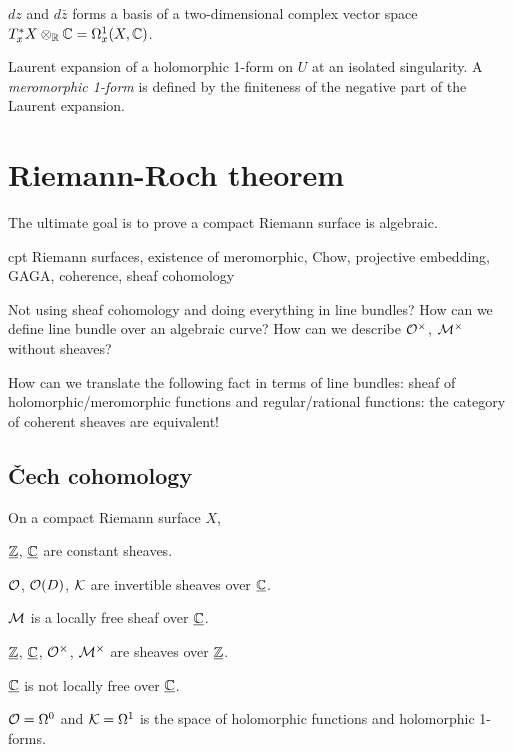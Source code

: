 \documentclass{../../large}
\begin{document}
$dz$ and $d\bar z$ forms a basis of a two-dimensional complex vector space $T_x^*X\otimes_{\mathbb{R}}\mathbb{C}=\Omega^1_x(X,\mathbb{C})$.

Laurent expansion of a holomorphic 1-form on $U$ at an isolated singularity.
A \emph{meromorphic 1-form} is defined by the finiteness of the negative part of the Laurent expansion.


\chapter{Riemann-Roch theorem}

The ultimate goal is to prove a compact Riemann surface is algebraic.

cpt Riemann surfaces, existence of meromorphic, Chow, projective embedding, GAGA, coherence, sheaf cohomology

Not using sheaf cohomology and doing everything in line bundles?
How can we define line bundle over an algebraic curve?
How can we describe $\mathcal{O}^\times$, $\mathcal{M}^\times$ without sheaves?

How can we translate the following fact in terms of line bundles:
sheaf of holomorphic/meromorphic functions and regular/rational functions: the category of coherent sheaves are equivalent!


\section{\v Cech cohomology}

On a compact Riemann surface $X$,
\begin{parts}
\item $\underline{\mathbb{Z}}$, $\underline{\mathbb{C}}$ are constant sheaves.
\item $\mathcal{O}$, $\mathcal{O}(D)$, $\mathcal{K}$ are invertible sheaves over $\underline{\mathbb{C}}$.
\item $\mathcal{M}$ is a locally free sheaf over $\underline{\mathbb{C}}$.
\item $\underline{\mathbb{Z}}$, $\underline{\mathbb{C}}$, $\mathcal{O}^\times$, $\mathcal{M}^\times$ are sheaves over $\underline{\mathbb{Z}}$.
\item $\underline{\mathbb{C}}$ is not locally free over $\underline{\mathbb{C}}$.
\item $\mathcal{O}=\Omega^0$ and $\mathcal{K}=\Omega^1$ is the space of holomorphic functions and holomorphic 1-forms.
\end{parts}

\begin{prb}
\end{prb}

\begin{prb}
\end{prb}
\end{document}
